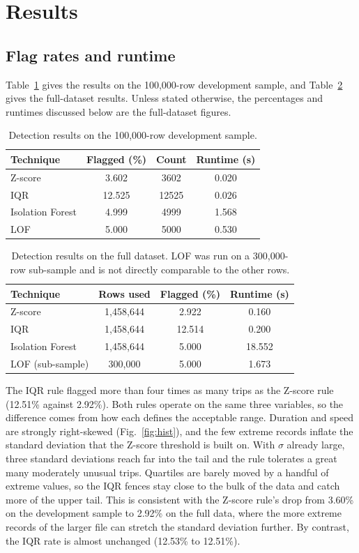 \documentclass{ieeeaccess}
\begin{document}
\section{Results}
\label{sec:results}

\subsection{Flag rates and runtime}
Table~\ref{tab:dev} gives the results on the 100,000-row development sample, and Table~\ref{tab:full} gives the full-dataset results. Unless stated otherwise, the percentages and runtimes discussed below are the full-dataset figures.

\begin{table}[!t]
\caption{Detection results on the 100,000-row development sample.}
\label{tab:dev}
\centering
\small
\begin{tabular}{lccc}
\hline
Technique & Flagged (\%) & Count & Runtime (s) \\
\hline
Z-score & 3.602 & 3602 & 0.020 \\
IQR & 12.525 & 12525 & 0.026 \\
Isolation Forest & 4.999 & 4999 & 1.568 \\
LOF & 5.000 & 5000 & 0.530 \\
\hline
\end{tabular}
\end{table}

\begin{table}[!t]
\caption{Detection results on the full dataset. LOF was run on a 300,000-row sub-sample and is not directly comparable to the other rows.}
\label{tab:full}
\centering
\small
\begin{tabular}{lccc}
\hline
Technique & Rows used & Flagged (\%) & Runtime (s) \\
\hline
Z-score & 1,458,644 & 2.922 & 0.160 \\
IQR & 1,458,644 & 12.514 & 0.200 \\
Isolation Forest & 1,458,644 & 5.000 & 18.552 \\
LOF (sub-sample) & 300,000 & 5.000 & 1.673 \\
\hline
\end{tabular}
\end{table}

The IQR rule flagged more than four times as many trips as the Z-score rule (12.51\% against 2.92\%). Both rules operate on the same three variables, so the difference comes from how each defines the acceptable range. Duration and speed are strongly right-skewed (Fig.~\ref{fig:hist}), and the few extreme records inflate the standard deviation that the Z-score threshold is built on. With $\sigma$ already large, three standard deviations reach far into the tail and the rule tolerates a great many moderately unusual trips. Quartiles are barely moved by a handful of extreme values, so the IQR fences stay close to the bulk of the data and catch more of the upper tail. This is consistent with the Z-score rule's drop from 3.60\% on the development sample to 2.92\% on the full data, where the more extreme records of the larger file can stretch the standard deviation further. By contrast, the IQR rate is almost unchanged (12.53\% to 12.51\%).
\end{document}

